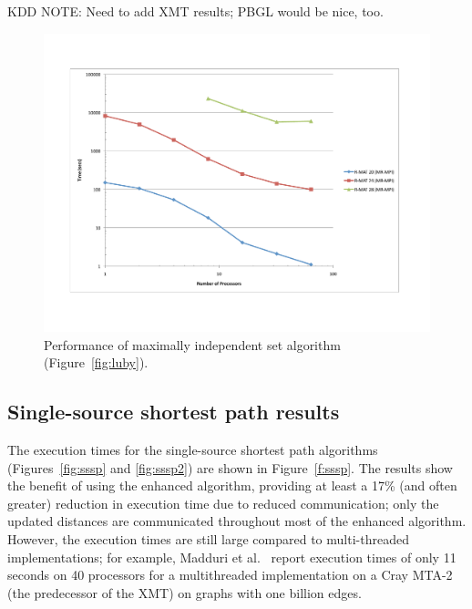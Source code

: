 KDD NOTE:  Need to add XMT results; PBGL would be nice, too.

\begin{figure}[h!]
\includegraphics[width=\textwidth]{fig_luby.pdf}
\caption{Performance of maximally independent set algorithm (Figure~\ref{fig:luby}).}
\label{f:luby}
\end{figure}

\subsection{Single-source shortest path results}

The execution times for the single-source shortest path algorithms
(Figures~\ref{fig:sssp} and \ref{fig:sssp2})
are shown in Figure~\ref{f:sssp}.  The results show the benefit of
using the enhanced algorithm, providing at least a 17\% (and often greater)
reduction in execution time due to reduced communication; only the updated
distances are communicated throughout most of the enhanced algorithm.
However, the execution times are still large compared to multi-threaded
implementations; for example, Madduri et al.~\cite{Madduri07} report
execution times of only 11 seconds on 40 
processors for a multithreaded implementation on a Cray MTA-2
(the predecessor of the XMT) on graphs with one billion edges.

